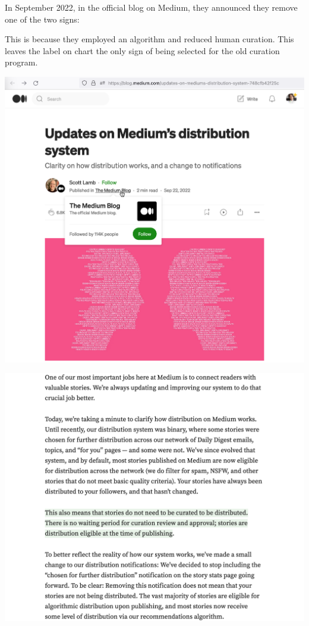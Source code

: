 In September 2022, in the official blog on Medium,
they announced they remove one of the two signs:


This is because they employed an algorithm and reduced human curation.
This leaves the  label on chart the only sign of being selected for the old curation program.

\begin{center}
    \includegraphics[width=38em]{no-more-p1}
\end{center}
\WillContinue
\pagebreak

\Continuing
\begin{center}
    \includegraphics[width=\textwidth]{no-more-p2}
\end{center}

\pagebreak
